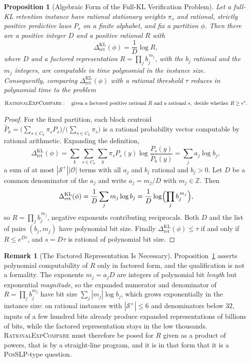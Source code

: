 \documentclass[12pt]{article}
\newtheorem{proposition}[theorem]{Proposition}
\theoremstyle{definition}
\newtheorem{remark}[theorem]{Remark}
\newcommand{\RetKL}{\Delta_{\mathrm{ret}}^{\mathrm{KL}}}
\newcommand{\Splus}{\mathcal S^{+}}
\begin{document}
\begin{proposition}[Algebraic Form of the Full-KL Verification Problem]
\label{prop:full-kl-algebraic-form}
Let a full-KL retention instance have rational stationary weights $\pi_s$ and
rational, strictly positive predictive laws $P_s$ on a finite alphabet, and fix
a partition $\phi$.  Then there are a positive integer $D$ and a positive
rational $R$ with
\[
\RetKL(\phi)=\frac1D\log R ,
\]
where $D$ and a \emph{factored} representation
$R=\prod_jb_j^{\,m_j}$, with the $b_j$ rational and the $m_j$ integers, are
computable in time polynomial in the instance size.  Consequently, comparing
$\RetKL(\phi)$ with a rational threshold $\tau$ reduces in polynomial time to
the problem
\[
\textsc{RationalExpCompare}:\quad
\text{given a factored positive rational }R\text{ and a rational }s,
\ \text{decide whether }R\ge e^{s}.
\]
\end{proposition}

\begin{proof}
For the fixed partition, each block centroid
$\bar P_k=\bigl(\sum_{s\in C_k}\pi_sP_s\bigr)/\bigl(\sum_{s\in C_k}\pi_s\bigr)$
is a rational probability vector computable by rational arithmetic.  Expanding
the definition,
\[
\RetKL(\phi)
=
\sum_k\sum_{s\in C_k}\sum_y\pi_sP_s(y)\log\frac{P_s(y)}{\bar P_k(y)}
=
\sum_ja_j\log b_j ,
\]
a sum of at most $|\Splus||\mathcal O|$ terms with all $a_j$ and $b_j$ rational
and $b_j>0$.  Let $D$ be a common denominator of the $a_j$ and write
$a_j=m_j/D$ with $m_j\in\mathbb Z$.  Then
\[
\RetKL(\phi)=\frac1D\sum_jm_j\log b_j=\frac1D\log\Bigl(\prod_jb_j^{\,m_j}\Bigr),
\]
so $R=\prod_jb_j^{\,m_j}$, negative exponents contributing reciprocals.  Both
$D$ and the list of pairs $(b_j,m_j)$ have polynomial bit size.  Finally
$\RetKL(\phi)\le\tau$ if and only if $R\le e^{D\tau}$, and $s=D\tau$ is
rational of polynomial bit size.
\end{proof}

\begin{remark}[The Factored Representation Is Necessary]
\label{rem:full-kl-slp}
Proposition~\ref{prop:full-kl-algebraic-form} asserts polynomial computability
of $R$ only in factored form, and the qualification is not a formality.  The
exponents $m_j=a_jD$ are integers of polynomial bit \emph{length} but
exponential \emph{magnitude}, so the expanded numerator and denominator of
$R=\prod_jb_j^{m_j}$ have bit size $\sum_j|m_j|\log b_j$, which grows
exponentially in the instance size: on rational instances with $|\Splus|\le6$
and denominators below $32$, inputs of a few hundred bits already produce
expanded representations of billions of bits, while the factored
representation stays in the low thousands.  \textsc{RationalExpCompare} must
therefore be posed for $R$ given as a product of powers, that is by a straight-line
program, and it is in that form that it is a \textsc{PosSLP}-type question.
\end{remark}
\end{document}

